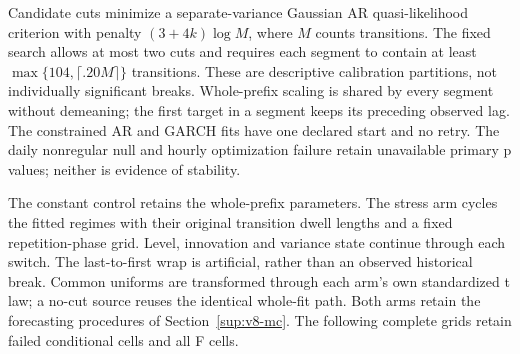 \documentclass[10pt,a4paper]{article}
\begin{document}
Candidate cuts minimize a separate-variance Gaussian AR quasi-likelihood
criterion with penalty \((3+4k)\log M\), where \(M\) counts transitions.
The fixed search allows at most two cuts and requires each segment to contain
at least \(\max\{104,\lceil .20M\rceil\}\) transitions.
These are descriptive calibration partitions, not individually significant
breaks. Whole-prefix scaling is shared by every segment without demeaning;
the first target in a segment keeps its preceding observed lag.
The constrained AR and GARCH fits have one declared start and no retry.
The daily nonregular null and hourly optimization failure retain unavailable
primary p values; neither is evidence of stability.

The constant control retains the whole-prefix parameters. The stress arm
cycles the fitted regimes with their original transition dwell lengths and a
fixed repetition-phase grid. Level, innovation and variance state continue
through each switch. The last-to-first wrap is artificial, rather than an
observed historical break. Common uniforms are transformed through each arm's
own standardized t law; a no-cut source reuses the identical whole-fit path.
Both arms retain the forecasting procedures of Section~\ref{sup:v8-mc}.
The following complete grids retain failed conditional cells and all F cells.
\end{document}
